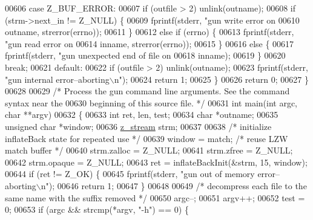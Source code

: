 \begin{DoxyCode}
{{{{00606     \textcolor{keywordflow}{case} Z\_BUF\_ERROR:
00607         \textcolor{keywordflow}{if} (outfile > 2) unlink(outname);
00608         \textcolor{keywordflow}{if} (strm->next\_in != Z\_NULL) \{
00609             fprintf(stderr, \textcolor{stringliteral}{"gun write error on %
00610                     outname, strerror(errno));
00611         \}
00612         \textcolor{keywordflow}{else} \textcolor{keywordflow}{if} (errno) \{
00613             fprintf(stderr, \textcolor{stringliteral}{"gun read error on %
00614                     inname, strerror(errno));
00615         \}
00616         \textcolor{keywordflow}{else} \{
00617             fprintf(stderr, \textcolor{stringliteral}{"gun unexpected end of file on %
00618                     inname);
00619         \}
00620         \textcolor{keywordflow}{break};
00621     \textcolor{keywordflow}{default}:
00622         \textcolor{keywordflow}{if} (outfile > 2) unlink(outname);
00623         fprintf(stderr, \textcolor{stringliteral}{"gun internal error--aborting\(\backslash\)n"});
00624         \textcolor{keywordflow}{return} 1;
00625     \}
00626     \textcolor{keywordflow}{return} 0;
00627 \}
00628 
00629 \textcolor{comment}{/* Process the gun command line arguments.  See the command syntax near the}
00630 \textcolor{comment}{   beginning of this source file. */}
00631 \textcolor{keywordtype}{int} main(\textcolor{keywordtype}{int} argc, \textcolor{keywordtype}{char} **argv)
00632 \{
00633     \textcolor{keywordtype}{int} ret, len, test;
00634     \textcolor{keywordtype}{char} *outname;
00635     \textcolor{keywordtype}{unsigned} \textcolor{keywordtype}{char} *window;
00636     \hyperlink{structz__stream__s}{z\_stream} strm;
00637 
00638     \textcolor{comment}{/* initialize inflateBack state for repeated use */}
00639     window = match;                         \textcolor{comment}{/* reuse LZW match buffer */}
00640     strm.zalloc = Z\_NULL;
00641     strm.zfree = Z\_NULL;
00642     strm.opaque = Z\_NULL;
00643     ret = inflateBackInit(&strm, 15, window);
00644     \textcolor{keywordflow}{if} (ret != Z\_OK) \{
00645         fprintf(stderr, \textcolor{stringliteral}{"gun out of memory error--aborting\(\backslash\)n"});
00646         \textcolor{keywordflow}{return} 1;
00647     \}
00648 
00649     \textcolor{comment}{/* decompress each file to the same name with the suffix removed */}
00650     argc--;
00651     argv++;
00652     test = 0;
00653     \textcolor{keywordflow}{if} (argc && strcmp(*argv, \textcolor{stringliteral}{"-h"}) == 0) \{
}}}}}}}
\end{DoxyCode}
